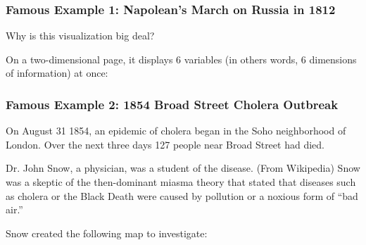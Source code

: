 \documentclass[handout]{beamer}
\newcommand{\blue}[1]{\textcolor{blue2}{#1}}
\begin{document}
\begin{frame}
\frametitle{Famous Example 1:  Napolean's March on Russia in 1812}
Why is this visualization big deal?

\vspace{0.5cm}

On a two-dimensional page, it displays 6 variables (in others words, 6 \blue{dimensions} of information) at once:

\vspace{5cm}

\end{frame}


\begin{frame}
\frametitle{Famous Example 2:  1854 Broad Street Cholera Outbreak}

On August 31 1854, an epidemic of cholera began in the Soho neighborhood of London.  Over the next three days 127 people near Broad Street had died.

\vspace{0.25cm}

\pause Dr. John Snow, a physician, was a student of the disease.  (From Wikipedia) Snow was a skeptic of the then-dominant \blue{miasma theory} that stated that diseases such as cholera or the Black Death were caused by pollution or a noxious form of ``bad air.'' 

\vspace{0.25cm}

\pause Snow created the following map to investigate:

\end{frame}
\end{document}
